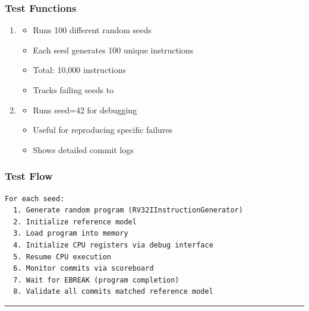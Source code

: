 \subsubsection{Test Functions}\label{cr:status:random-tests-status:test-functions}

\begin{record}

\begin{enumerate}
\def\labelenumi{\arabic{enumi}.}
\item
  \textbf{}

  \begin{itemize}
  \tightlist
  \item
    Runs 100 different random seeds
  \item
    Each seed generates 100 unique instructions
  \item
    Total: 10,000 instructions
  \item
    Tracks failing seeds to 
  \end{itemize}
\item
  \textbf{}

  \begin{itemize}
  \tightlist
  \item
    Runs seed=42 for debugging
  \item
    Useful for reproducing specific failures
  \item
    Shows detailed commit logs
  \end{itemize}
\end{enumerate}

\end{record}

\subsubsection{Test Flow}\label{cr:status:random-tests-status:test-flow}

\begin{record}

\begin{lstlisting}[language={}]
For each seed:
  1. Generate random program (RV32IInstructionGenerator)
  2. Initialize reference model
  3. Load program into memory
  4. Initialize CPU registers via debug interface
  5. Resume CPU execution
  6. Monitor commits via scoreboard
  7. Wait for EBREAK (program completion)
  8. Validate all commits matched reference model
\end{lstlisting}

\begin{center}\rule{0.5\linewidth}{0.5pt}\end{center}

\end{record}

